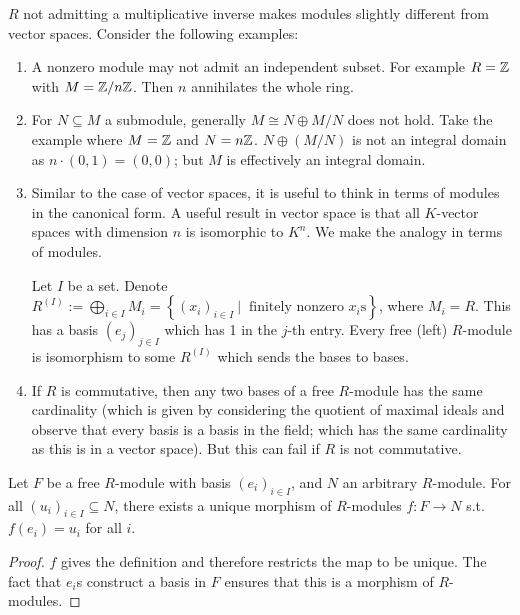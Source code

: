 \documentclass{article}
\begin{document}
\begin{remark}\label{rmk:4.1}
    $R$ not admitting a multiplicative inverse makes modules slightly different from vector spaces. Consider the following examples:
    \begin{enumerate}
        \item A nonzero module may not admit an independent subset. For example $R=\mathbb{Z}$ with $M = \mathbb{Z}/n\mathbb{Z}$. Then $n$ annihilates the whole ring.
        \item For $N\subseteq M$ a submodule, generally $M \cong N \oplus M/N$ does not hold. Take the example where $M = \mathbb{Z}$ and $N = n\mathbb{Z}$. $N \oplus (M/N)$ is not an integral domain as $n\cdot(0, 1) = (0, 0)$; but $M$ is effectively an integral domain.
        \item Similar to the case of vector spaces, it is useful to think in terms of modules in the canonical form. A useful result in vector space is that all $K$-vector spaces with dimension $n$ is isomorphic to $K^n$. We make the analogy in terms of modules. 
        
        Let $I$ be a set. Denote $R^{(I)} := \bigoplus_{i\in I} M_i = \left\{ (x_i)_{i\in I}\ \Big|\ \text{ finitely nonzero }x_i\text{s} \right\}$, where $M_i = R$. This has a basis $(e_j)_{j\in I}$ which has 1 in the $j$-th entry. Every free (left) $R$-module is isomorphism to some $R^{(I)}$ which sends the bases to bases.
        \item If $R$ is commutative, then any two bases of a free $R$-module has the same cardinality (which is given by considering the quotient of maximal ideals and observe that every basis is a basis in the field; which has the same cardinality as this is in a vector space). But this can fail if $R$ is not commutative.
    \end{enumerate}
\end{remark}

\begin{theorem}\label{thm:Universal Property of Free Modules}
    Let $F$ be a free $R$-module with basis $(e_i)_{i\in I}$, and $N$ an arbitrary $R$-module. For all $(u_i)_{i\in I} \subseteq N$, there exists a unique morphism of $R$-modules $f: F\to N$ s.t. $f(e_i) = u_i$ for all $i$.
\end{theorem}

\begin{proof}
    $f$ gives the definition and therefore restricts the map to be unique. The fact that $e_i$s construct a basis in $F$ ensures that this is a morphism of $R$-modules. 
\end{proof}
\end{document}
